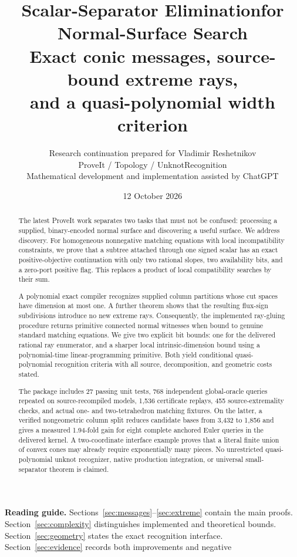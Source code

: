 \documentclass[11pt]{article}
\title{\textbf{Scalar-Separator Elimination\newline for Normal-Surface Search}\\[7pt]
\large Exact conic messages, source-bound extreme rays,\\
and a quasi-polynomial width criterion}
\author{Research continuation prepared for Vladimir Reshetnikov\\
\small ProveIt / Topology / UnknotRecognition\\
\small Mathematical development and implementation assisted by ChatGPT}
\date{12 October 2026}
\theoremstyle{definition}
\theoremstyle{remark}
\begin{document}
\maketitle
\begin{abstract}
The latest ProveIt work separates two tasks that must not be confused:
processing a supplied, binary-encoded normal surface and discovering a useful
surface. We address discovery. For homogeneous nonnegative matching equations
with local incompatibility constraints, we prove that a subtree attached
through one signed scalar has an exact positive-objective continuation with
only two rational slopes, two availability bits, and a zero-port positive flag.
This replaces a product of local compatibility searches by their sum.

A polynomial exact compiler recognizes supplied column partitions whose cut
spaces have dimension at most one. A further theorem shows that the resulting
flux-sign subdivisions introduce no new extreme rays. Consequently, the
implemented ray-gluing procedure returns primitive connected normal witnesses
when bound to genuine standard matching equations. We give two explicit bit
bounds: one for the delivered rational ray enumerator, and a sharper local
intrinsic-dimension bound using a polynomial-time linear-programming primitive.
Both yield conditional quasi-polynomial recognition criteria with all source,
decomposition, and geometric costs stated.

The package includes 27 passing unit tests, 768 independent global-oracle
queries repeated on source-recompiled models, 1,536 certificate replays,
455 source-extremality checks, and actual one- and two-tetrahedron matching
fixtures. On the latter, a verified nongeometric column split reduces candidate
bases from 3,432 to 1,856 and gives a measured 1.94-fold gain for eight complete
anchored Euler queries in the delivered kernel. A two-coordinate interface
example proves that a literal finite union of convex cones may already require
exponentially many pieces. No unrestricted quasi-polynomial unknot recognizer,
native production integration, or universal small-separator theorem is claimed.
\end{abstract}
\vspace{4pt}
\noindent\textbf{Reading guide.} Sections~\ref{sec:messages}--\ref{sec:extreme}
contain the main proofs. Section~\ref{sec:complexity} distinguishes implemented
and theoretical bounds. Section~\ref{sec:geometry} states the exact recognition
interface. Section~\ref{sec:evidence} records both improvements and negative
\end{document}

